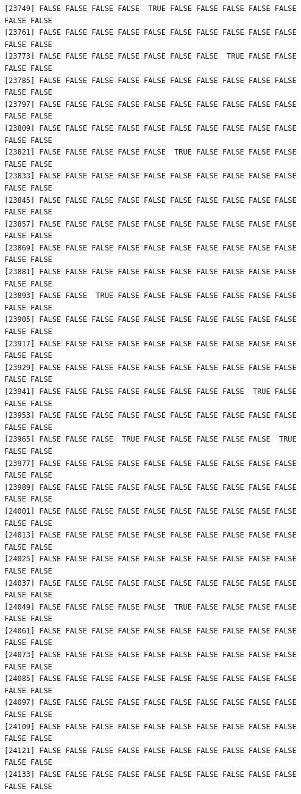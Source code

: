 \documentclass[
  a4paper,
  DIV=11,
  numbers=noendperiod]{scrartcl}
\begin{document}
\begin{verbatim}
[23749] FALSE FALSE FALSE FALSE  TRUE FALSE FALSE FALSE FALSE FALSE FALSE FALSE
[23761] FALSE FALSE FALSE FALSE FALSE FALSE FALSE FALSE FALSE FALSE FALSE FALSE
[23773] FALSE FALSE FALSE FALSE FALSE FALSE FALSE  TRUE FALSE FALSE FALSE FALSE
[23785] FALSE FALSE FALSE FALSE FALSE FALSE FALSE FALSE FALSE FALSE FALSE FALSE
[23797] FALSE FALSE FALSE FALSE FALSE FALSE FALSE FALSE FALSE FALSE FALSE FALSE
[23809] FALSE FALSE FALSE FALSE FALSE FALSE FALSE FALSE FALSE FALSE FALSE FALSE
[23821] FALSE FALSE FALSE FALSE FALSE  TRUE FALSE FALSE FALSE FALSE FALSE FALSE
[23833] FALSE FALSE FALSE FALSE FALSE FALSE FALSE FALSE FALSE FALSE FALSE FALSE
[23845] FALSE FALSE FALSE FALSE FALSE FALSE FALSE FALSE FALSE FALSE FALSE FALSE
[23857] FALSE FALSE FALSE FALSE FALSE FALSE FALSE FALSE FALSE FALSE FALSE FALSE
[23869] FALSE FALSE FALSE FALSE FALSE FALSE FALSE FALSE FALSE FALSE FALSE FALSE
[23881] FALSE FALSE FALSE FALSE FALSE FALSE FALSE FALSE FALSE FALSE FALSE FALSE
[23893] FALSE FALSE  TRUE FALSE FALSE FALSE FALSE FALSE FALSE FALSE FALSE FALSE
[23905] FALSE FALSE FALSE FALSE FALSE FALSE FALSE FALSE FALSE FALSE FALSE FALSE
[23917] FALSE FALSE FALSE FALSE FALSE FALSE FALSE FALSE FALSE FALSE FALSE FALSE
[23929] FALSE FALSE FALSE FALSE FALSE FALSE FALSE FALSE FALSE FALSE FALSE FALSE
[23941] FALSE FALSE FALSE FALSE FALSE FALSE FALSE FALSE  TRUE FALSE FALSE FALSE
[23953] FALSE FALSE FALSE FALSE FALSE FALSE FALSE FALSE FALSE FALSE FALSE FALSE
[23965] FALSE FALSE FALSE  TRUE FALSE FALSE FALSE FALSE FALSE  TRUE FALSE FALSE
[23977] FALSE FALSE FALSE FALSE FALSE FALSE FALSE FALSE FALSE FALSE FALSE FALSE
[23989] FALSE FALSE FALSE FALSE FALSE FALSE FALSE FALSE FALSE FALSE FALSE FALSE
[24001] FALSE FALSE FALSE FALSE FALSE FALSE FALSE FALSE FALSE FALSE FALSE FALSE
[24013] FALSE FALSE FALSE FALSE FALSE FALSE FALSE FALSE FALSE FALSE FALSE FALSE
[24025] FALSE FALSE FALSE FALSE FALSE FALSE FALSE FALSE FALSE FALSE FALSE FALSE
[24037] FALSE FALSE FALSE FALSE FALSE FALSE FALSE FALSE FALSE FALSE FALSE FALSE
[24049] FALSE FALSE FALSE FALSE FALSE  TRUE FALSE FALSE FALSE FALSE FALSE FALSE
[24061] FALSE FALSE FALSE FALSE FALSE FALSE FALSE FALSE FALSE FALSE FALSE FALSE
[24073] FALSE FALSE FALSE FALSE FALSE FALSE FALSE FALSE FALSE FALSE FALSE FALSE
[24085] FALSE FALSE FALSE FALSE FALSE FALSE FALSE FALSE FALSE FALSE FALSE FALSE
[24097] FALSE FALSE FALSE FALSE FALSE FALSE FALSE FALSE FALSE FALSE FALSE FALSE
[24109] FALSE FALSE FALSE FALSE FALSE FALSE FALSE FALSE FALSE FALSE FALSE FALSE
[24121] FALSE FALSE FALSE FALSE FALSE FALSE FALSE FALSE FALSE FALSE FALSE FALSE
[24133] FALSE FALSE FALSE FALSE FALSE FALSE FALSE FALSE FALSE FALSE FALSE FALSE

\end{verbatim}
\end{document}
